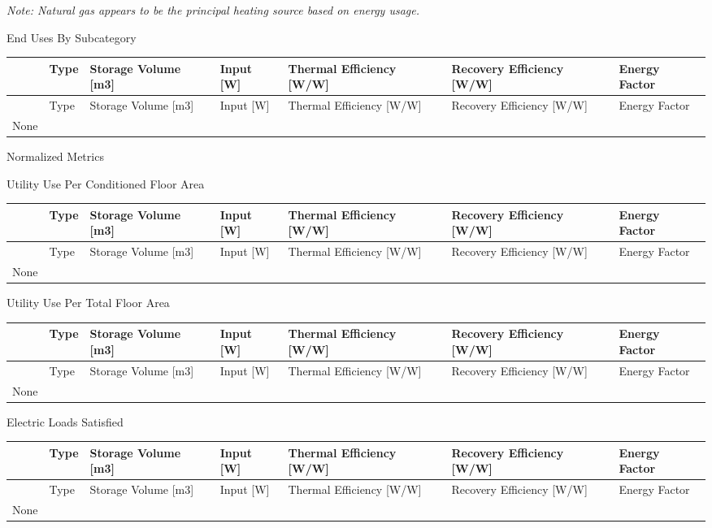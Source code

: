 \emph{Note: Natural gas appears to be the principal heating source based on energy usage.}

End Uses By Subcategory

\begin{longtable}[c]{p{0.85in}p{0.85in}p{0.85in}p{0.85in}p{0.85in}p{0.85in}p{0.85in}}
\toprule 
~ & Type & Storage Volume [m3] & Input [W] & Thermal Efficiency [W/W] & Recovery Efficiency [W/W] & Energy Factor \tabularnewline
\midrule
\endfirsthead

\toprule 
~ & Type & Storage Volume [m3] & Input [W] & Thermal Efficiency [W/W] & Recovery Efficiency [W/W] & Energy Factor \tabularnewline
\midrule
\endhead

None & ~ & ~ & ~ & ~ & ~ & ~ \tabularnewline
\bottomrule
\end{longtable}

Normalized Metrics

Utility Use Per Conditioned Floor Area

\begin{longtable}[c]{p{0.85in}p{0.85in}p{0.85in}p{0.85in}p{0.85in}p{0.85in}p{0.85in}}
\toprule 
~ & Type & Storage Volume [m3] & Input [W] & Thermal Efficiency [W/W] & Recovery Efficiency [W/W] & Energy Factor \tabularnewline
\midrule
\endfirsthead

\toprule 
~ & Type & Storage Volume [m3] & Input [W] & Thermal Efficiency [W/W] & Recovery Efficiency [W/W] & Energy Factor \tabularnewline
\midrule
\endhead

None & ~ & ~ & ~ & ~ & ~ & ~ \tabularnewline
\bottomrule
\end{longtable}

Utility Use Per Total Floor Area

\begin{longtable}[c]{p{0.85in}p{0.85in}p{0.85in}p{0.85in}p{0.85in}p{0.85in}p{0.85in}}
\toprule 
~ & Type & Storage Volume [m3] & Input [W] & Thermal Efficiency [W/W] & Recovery Efficiency [W/W] & Energy Factor \tabularnewline
\midrule
\endfirsthead

\toprule 
~ & Type & Storage Volume [m3] & Input [W] & Thermal Efficiency [W/W] & Recovery Efficiency [W/W] & Energy Factor \tabularnewline
\midrule
\endhead

None & ~ & ~ & ~ & ~ & ~ & ~ \tabularnewline
\bottomrule
\end{longtable}

Electric Loads Satisfied

\begin{longtable}[c]{p{0.85in}p{0.85in}p{0.85in}p{0.85in}p{0.85in}p{0.85in}p{0.85in}}
\toprule 
~ & Type & Storage Volume [m3] & Input [W] & Thermal Efficiency [W/W] & Recovery Efficiency [W/W] & Energy Factor \tabularnewline
\midrule
\endfirsthead

\toprule 
~ & Type & Storage Volume [m3] & Input [W] & Thermal Efficiency [W/W] & Recovery Efficiency [W/W] & Energy Factor \tabularnewline
\midrule
\endhead

None & ~ & ~ & ~ & ~ & ~ & ~ \tabularnewline
\bottomrule
\end{longtable}

